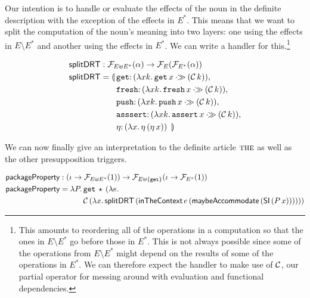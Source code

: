 Our intention is to handle or evaluate the effects of the noun in the
definite description with the exception of the effects in $E^*$. This means
that we want to split the computation of the noun's meaning into two
layers: one using the effects in $E \setminus E^*$ and another using the
effects in $E^*$. We can write a handler for this.\footnote{This amounts to
  reordering all of the operations in a computation so that the ones in
  $E \setminus E^*$ go before those in $E^*$. This is not always possible
  since some of the operations from $E \setminus E^*$ might depend on the
  results of some of the operations in $E^*$. We can therefore expect the
  handler to make use of $\mathcal{C}$, our partial operator for messing around
  with evaluation and functional dependencies.}

\begin{align*}
  \splitDRT &: \FF_{E \uplus E^*}(\alpha) \to \FF_E(\FF_{E^*}(\alpha)) \\
  \splitDRT &= \lban \begin{aligned}[t]
      &\onto{\op{get}}{(\lam{x k}{\ap{\op{get}}{x} \apr (\ap{\CC}{k})})}, \\
      &\onto{\op{fresh}}{(\lam{x k}{\ap{\op{fresh}}{x} \apr (\ap{\CC}{k})})}, \\
      &\onto{\op{push}}{(\lam{x k}{\ap{\op{push}}{x} \apr (\ap{\CC}{k})})}, \\
      &\onto{\op{asssert}}{(\lam{x k}{\ap{\op{assert}}{x} \apr (\ap{\CC}{k})})}, \\
      &\onto{\eta}{(\lam{x}{\etaE{(\etaE{x})}})}\ \rban
    \end{aligned}
\end{align*}

We can now finally give an interpretation to the definite article
$\textsc{the}$ as well as the other presupposition triggers.

\begin{align*}
  \textsf{packageProperty} &: (\iota \to \mathcal{F}_{E \uplus E^*}(1))
                  \to \mathcal{F}_{E \uplus \{\mathtt{get}\}}(\iota \to \mathcal{F}_{E^*}(1)) \\
  \textsf{packageProperty} &= \lambda P.\, \begin{aligned}[t]
      &\mathtt{get}\,\star\,(\lambda e.\,  \\
      &\mathcal{C}\,(\lambda x.\, \textsf{splitDRT}\,(\textsf{inTheContext}\,e\,(\textsf{maybeAccommodate}\,(\textsf{SI}\,(P\,x))))))
    \end{aligned}
\end{align*}

